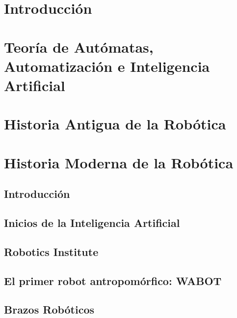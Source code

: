 \documentclass[a4paper,11pt]{article}
\begin{document}
\tableofcontents

\newpage

\section{Introducción}


\section{Teoría de Autómatas, Automatización e Inteligencia Artificial}


\section{Historia Antigua de la Robótica}


\section{Historia Moderna de la Robótica}

\subsection{Introducción}


\subsection{Inicios de la Inteligencia Artificial}


\subsection{Robotics Institute}


\subsection{El primer robot antropomórfico: WABOT}


\subsection{Brazos Robóticos}

\end{document}
